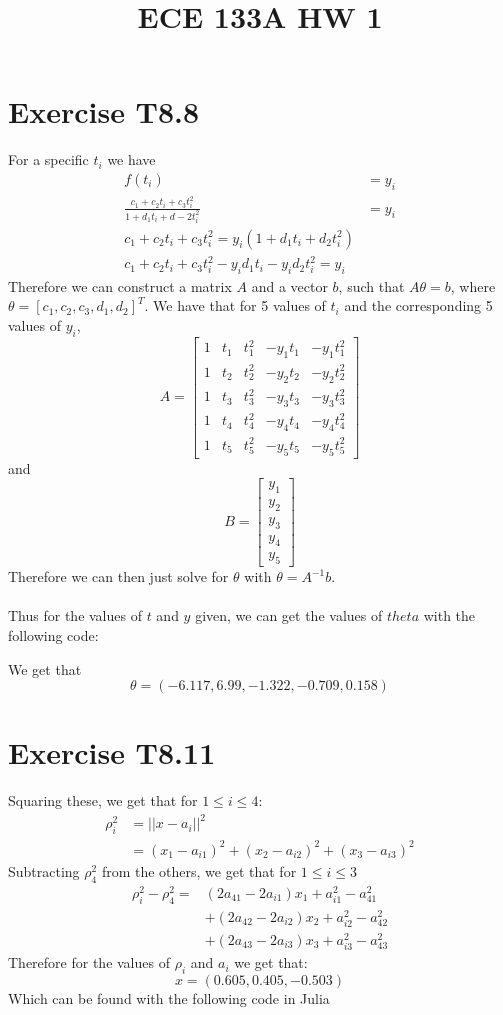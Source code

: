 
\title{ECE 133A HW 1}

\maketitle
\section*{Exercise T8.8}
For a specific $t_i$ we have 
\begin{align*}
    f(t_i)&=y_i\\
    \frac{c_1+c_2t_i+c_3t_i^2}{1+d_1t_i+d-2t_i^2}&=y_i\\
    c_1+c_2t_i+c_3t_i^2=y_i(1+d_1t_i+d_2t_i^2)\\
    c_1+c_2t_i+c_3t_i^2-y_{i}d_1t_i-y_{i}d_2t_i^2=y_i
\end{align*}
Therefore we can construct a matrix $A$ and a vector $b$, such that 
$A\theta=b$, where $\theta=[c_1,c_2,c_3,d_1,d_2]^T$. We have that for 
5 values of $t_i$ and the corresponding 5 values of $y_i$,
$$A=\begin{bmatrix}
    1&t_1&t_1^2&-y_{1}t_1&-y_{1}t_1^2\\
    1&t_2&t_2^2&-y_{2}t_2&-y_{2}t_2^2\\
    1&t_3&t_3^2&-y_{3}t_3&-y_{3}t_3^2\\
    1&t_4&t_4^2&-y_{4}t_4&-y_{4}t_4^2\\
    1&t_5&t_5^2&-y_{5}t_5&-y_{5}t_5^2
\end{bmatrix}$$
and
$$B=\begin{bmatrix}
    y_1\\
    y_2\\
    y_3\\
    y_4\\
    y_5
\end{bmatrix}$$
Therefore we can then just solve for $\theta$ with $\theta=A^{-1}b$.
\\\\
Thus for the values of $t$ and $y$ given, we can get the values of $theta$
with the following code:

We get that
$$\theta=\boxed{(-6.117, 6.99, -1.322, -0.709, 0.158)}$$
\section*{Exercise T8.11}
Squaring these, we get that for $1\leq i\leq 4$:
\begin{align*}
	\rho_i^2&=||x-a_i||^2\\
	&=(x_1-a_{i1})^2+(x_2-a_{i2})^2+(x_3-a_{i3})^2
\end{align*}
Subtracting $\rho_4^2$ from the others, we get that for $1\leq i \leq 3$ 
\begin{align*}
	\rho_i^2-\rho_4^2=&
	(2a_{41}-2a_{i1})x_1+a_{i1}^2-a_{41}^2\\
	&+(2a_{42}-2a_{i2})x_2+a_{i2}^2-a_{42}^2\\
	&+(2a_{43}-2a_{i3})x_3+a_{i3}^2-a_{43}^2
\end{align*}
Therefore for the values of $\rho_i$ and $a_i$ we get that:
$$x=(0.605, 0.405, -0.503)$$
Which can be found with the following code in Julia

